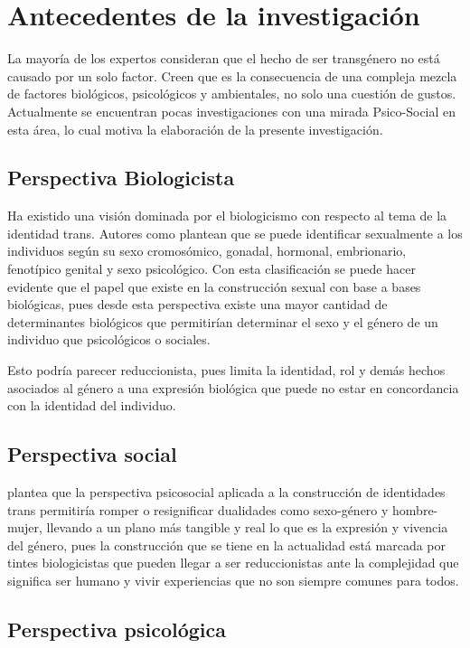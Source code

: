 \section{Antecedentes de la investigación}

La mayoría de los expertos consideran que el hecho de ser transgénero no está
causado por un solo factor. Creen que es la consecuencia de una compleja mezcla
de factores biológicos, psicológicos y ambientales, no solo una cuestión de
gustos. Actualmente se encuentran pocas investigaciones con una mirada
Psico-Social en esta área, lo cual motiva la elaboración de la presente
investigación.

\subsection{Perspectiva Biologicista}

Ha existido una visión dominada por el biologicismo con respecto al tema de la
identidad trans. Autores como \textcite{Lugo2016} plantean que se puede identificar
sexualmente a los individuos según su sexo cromosómico, gonadal, hormonal,
embrionario, fenotípico genital y sexo psicológico. Con esta clasificación se
puede hacer evidente que el papel que existe en la construcción sexual con base
a bases biológicas, pues desde esta perspectiva existe una mayor cantidad de
determinantes biológicos que permitirían determinar el sexo y el género de un
individuo que psicológicos o sociales.

Esto podría parecer reduccionista, pues limita la identidad, rol y demás hechos
asociados al género a una expresión biológica que puede no estar en concordancia
con la identidad del individuo.

\subsection{Perspectiva social}

\textcite{Martinez-Guzman2012} plantea que la perspectiva psicosocial aplicada a
la construcción de identidades trans permitiría romper o resignificar dualidades
como sexo-género y hombre-mujer,  llevando a un plano más tangible y real lo que
es la expresión y vivencia del género, pues la construcción que se tiene en la
actualidad está marcada por tintes biologicistas que pueden llegar a ser
reduccionistas ante la complejidad que significa ser humano y vivir experiencias
que no son siempre comunes para todos.

\subsection{Perspectiva psicológica}


